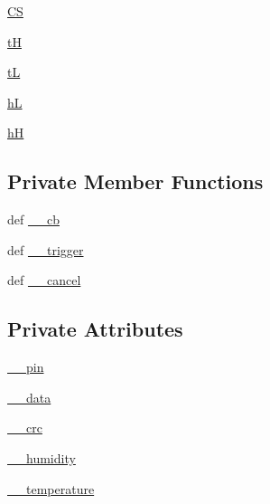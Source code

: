 \begin{DoxyCompactItemize}
\item 
\hyperlink{classlibsensorPy_1_1concretesensor_1_1dht22Temperature_1_1DHT22Temperature_ae1a4bd0ed1ee699a3d45da4e6864ed43}{C\+S}
\item 
\hyperlink{classlibsensorPy_1_1concretesensor_1_1dht22Temperature_1_1DHT22Temperature_a616d44d66366cf226904e9e6867ccd37}{t\+H}
\item 
\hyperlink{classlibsensorPy_1_1concretesensor_1_1dht22Temperature_1_1DHT22Temperature_ae9528cd4be0fa3526f2aa9a78196d6aa}{t\+L}
\item 
\hyperlink{classlibsensorPy_1_1concretesensor_1_1dht22Temperature_1_1DHT22Temperature_a3b445c2ddb732e30e53b5e8cc295b310}{h\+L}
\item 
\hyperlink{classlibsensorPy_1_1concretesensor_1_1dht22Temperature_1_1DHT22Temperature_a9d39b5a7fe2c5466ac016976d15d535b}{h\+H}
\end{DoxyCompactItemize}
\subsection*{Private Member Functions}
\begin{DoxyCompactItemize}
\item 
def \hyperlink{classlibsensorPy_1_1concretesensor_1_1dht22Temperature_1_1DHT22Temperature_afc0c74d334748bacb291e1a034554466}{\+\_\+\+\_\+cb}
\item 
def \hyperlink{classlibsensorPy_1_1concretesensor_1_1dht22Temperature_1_1DHT22Temperature_aa37621e30cf90d34b7bb0337a338f2f1}{\+\_\+\+\_\+trigger}
\item 
def \hyperlink{classlibsensorPy_1_1concretesensor_1_1dht22Temperature_1_1DHT22Temperature_a0f8094d1fcdd80b073a6ae93bfd325c2}{\+\_\+\+\_\+cancel}
\end{DoxyCompactItemize}
\subsection*{Private Attributes}
\begin{DoxyCompactItemize}
\item 
\hyperlink{classlibsensorPy_1_1concretesensor_1_1dht22Temperature_1_1DHT22Temperature_ad5eb030e502eb5ac7e51ddb786e3fd3c}{\+\_\+\+\_\+pin}
\item 
\hyperlink{classlibsensorPy_1_1concretesensor_1_1dht22Temperature_1_1DHT22Temperature_a457643ec751acd87187ca6251e45ede3}{\+\_\+\+\_\+data}
\item 
\hyperlink{classlibsensorPy_1_1concretesensor_1_1dht22Temperature_1_1DHT22Temperature_a86b17edb8071d439965987c4d6c6afe4}{\+\_\+\+\_\+crc}
\item 
\hyperlink{classlibsensorPy_1_1concretesensor_1_1dht22Temperature_1_1DHT22Temperature_a9508b6e6d5595b4542ac935d62e2bb89}{\+\_\+\+\_\+humidity}
\item 
\hyperlink{classlibsensorPy_1_1concretesensor_1_1dht22Temperature_1_1DHT22Temperature_ad1c96c156b931d1414856b4069c1fa5f}{\+\_\+\+\_\+temperature}
\end{DoxyCompactItemize}


